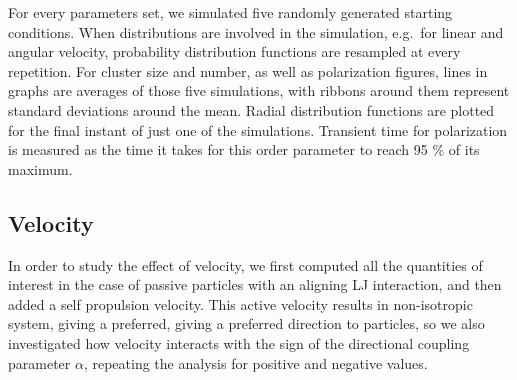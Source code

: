 \documentclass[../../master_thesis_np.tex]{subfiles}
\begin{document}
		For every parameters set, we simulated five randomly generated starting conditions.
		When distributions are involved in the simulation, e.g.\ for linear and angular velocity, probability distribution functions are resampled at every repetition.
		For cluster size and number, as well as polarization figures, lines in graphs are averages of those five simulations, with ribbons around them represent standard deviations around the mean.
		Radial distribution functions are plotted for the final instant of just one of the simulations.
		Transient time for polarization is measured as the time it takes for this order parameter to reach \num{95} \% of its maximum.
		
		\subsection{Velocity}
		\label{velocity}
		In order to study the effect of velocity, we first computed all the quantities of interest in the case of passive particles with an aligning LJ interaction, and then added a self propulsion velocity. 
		This active velocity results in non-isotropic system, giving a preferred, giving a preferred direction to particles, so we also investigated how velocity interacts with the sign of the directional coupling parameter $\alpha$, repeating the analysis for positive and negative values.
		
\end{document}
